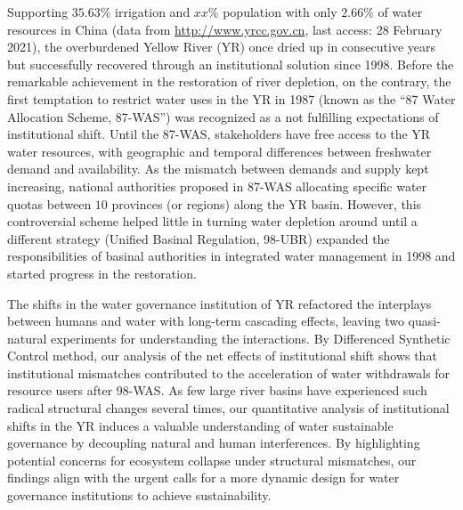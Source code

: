 Supporting $35.63\%$ irrigation and $xx\%$ population with only $2.66\%$ of water resources in China (data from \href{http://www.yrcc.gov.cn}{http://www.yrcc.gov.cn}, last access: 28 February 2021), the overburdened Yellow River (YR) once dried up in consecutive years but successfully recovered through an institutional solution since 1998.
Before the remarkable achievement in the restoration of river depletion, on the contrary, the first temptation to restrict water uses in the YR in 1987 (known as the ``87 Water Allocation Scheme, 87-WAS'') was recognized as a not fulfilling expectations of institutional shift.
Until the 87-WAS, stakeholders have free access to the YR water resources, with geographic and temporal differences between freshwater demand and availability.
As the mismatch between demands and supply kept increasing, national authorities proposed in 87-WAS allocating specific water quotas between $10$ provinces (or regions) along the YR basin.
However, this controversial scheme helped little in turning water depletion around until a different strategy (Unified Basinal Regulation, 98-UBR) expanded the responsibilities of basinal authorities in integrated water management in 1998 and started progress in the restoration.

The shifts in the water governance institution of YR refactored the interplays between humans and water with long-term cascading effects, leaving two quasi-natural experiments for understanding the interactions.
By Differenced Synthetic Control method, our analysis of the net effects of institutional shift shows that institutional mismatches contributed to the acceleration of water withdrawals for resource users after 98-WAS.
As few large river basins have experienced such radical structural changes several times, our quantitative analysis of institutional shifts in the YR induces a valuable understanding of water sustainable governance by decoupling natural and human interferences.
By highlighting potential concerns for ecosystem collapse under structural mismatches, our findings align with the urgent calls for a more dynamic design for water governance institutions to achieve sustainability.
